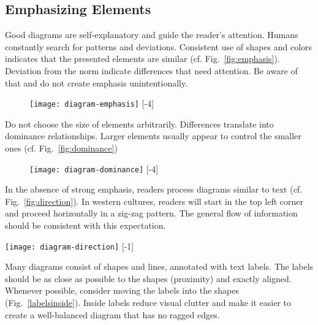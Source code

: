 \subsection{Emphasizing Elements}

Good diagrams are self-explanatory and guide the reader's attention. Humans constantly search for patterns and deviations. Consistent use of shapes and colors indicates that the presented elements are similar (cf. Fig.~\ref{fig:emphasis}). Deviation from the norm indicate differences that need attention. Be aware of that and do not create emphasis unintentionally.

\begin{figure}[t]
\centering
\texttt{[image: diagram-emphasis]}
[-4\baselineskip]
\end{figure}

Do not choose the size of elements arbitrarily. Differences translate into dominance relationships. Larger elements usually appear to control the smaller ones (cf. Fig.~\ref{fig:dominance})

\begin{figure}[t]
\centering
\texttt{[image: diagram-dominance]}
[-4\baselineskip]
\end{figure}

In the absence of strong emphasis, readers process diagrams similar to text (cf. Fig.~\ref{fig:direction}). In western cultures, readers will start in the top left corner and proceed horizontally in a zig-zag pattern. The general flow of information should be consistent with this expectation.

\begin{marginfigure}
\centering
\texttt{[image: diagram-direction]}
[-1\baselineskip]
\end{marginfigure}

Many diagrams consist of shapes and lines, annotated with text labels. The labels should be as close as possible to the shapes (proximity) and exactly aligned. Whenever possible, consider moving the labels into the shapes (Fig.~\ref{labelsinside}). Inside labels reduce visual clutter and make it easier to create a well-balanced diagram that has no ragged edges.


